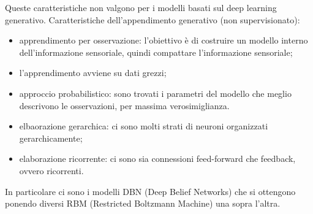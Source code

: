 Queste caratteristiche non valgono per i modelli basati sul deep learning
generativo. Caratteristiche dell'appendimento generativo (non supervisionato):
\begin{itemize}
	\item apprendimento per osservazione: l'obiettivo è di costruire un modello
		interno dell'informazione sensoriale, quindi compattare l'informazione
		sensoriale;

	\item l'apprendimento avviene su dati grezzi;

	\item approccio probabilistico: sono trovati i parametri del modello che
		meglio descrivono le osservazioni, per massima verosimiglianza.

	\item elbaorazione gerarchica: ci sono molti strati di neuroni organizzati
		gerarchicamente;

	\item elaborazione ricorrente: ci sono sia connessioni feed-forward che
		feedback, ovvero ricorrenti.
\end{itemize}

In particolare ci sono i modelli DBN (Deep Belief Networks) che si ottengono
ponendo diversi RBM (Restricted Boltzmann Machine) una sopra l'altra.
